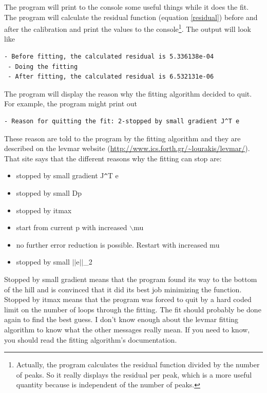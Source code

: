The program will print to the console some useful things
while it does the fit. The program will calculate the residual 
function (equation \ref{residual}) before and 
after the calibration and print the values to the
console\footnote{Actually, the program
calculates the residual function divided by the number
of peaks. So it really displays the residual per peak, 
which is a more useful quantity because is independent
of the number of peaks.}. The output will look like
\begin{lstlisting}[caption={Displaying the Residual}]
 - Before fitting, the calculated residual is 5.336138e-04
 - Doing the fitting
 - After fitting, the calculated residual is 6.532131e-06
\end{lstlisting}
The program will display the reason why the fitting
algorithm decided to quit. For example, the program
might print out
\begin{lstlisting}[caption={Reason For Quitting}]
 - Reason for quitting the fit: 2-stopped by small gradient J^T e
\end{lstlisting}
These reason are told to the program by the fitting
algorithm and they are described on the levmar website
(\url{http://www.ics.forth.gr/~lourakis/levmar/}).
That site says that the different reasons why the
fitting can stop are:
\begin{itemize}
    \item stopped by small gradient J\verb!^!T e
    \item stopped by small Dp
    \item stopped by itmax
    \item start from current p with increased $\backslash$mu
    \item no further error reduction is possible. 
    Restart with increased mu
    \item stopped by small $||$e$||$\_2\cite{lourakis04LM}
\end{itemize}
Stopped by small gradient means that the program found its way
to the bottom of the hill and is convinced that it did its best
job minimizing the function. Stopped by itmax
means that the program was forced to quit by a hard coded limit
on the number of loops through the fitting. The fit should
probably be done again to find the best guess.
I don't know enough about the levmar fitting algorithm to know 
what the other messages really mean. If you need to know, you 
should read the fitting algorithm's documentation. 

